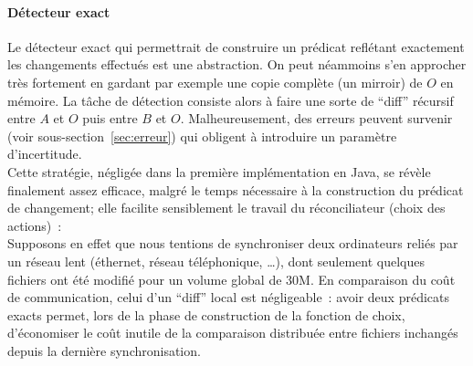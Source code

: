 \documentclass[11pt]{report}
\begin{document}
\paragraph{D\'etecteur exact\\}
Le d\'etecteur exact qui permettrait de construire un pr\'edicat refl\'etant 
exactement les changements effectu\'es est une abstraction. On peut n\'eammoins 
s'en approcher tr\`es
fortement en gardant par exemple une copie compl\`ete (un mirroir) de $O$ en 
m\'emoire. La t\^ache de d\'etection consiste alors \`a faire une sorte de ``diff'' 
r\'ecursif entre $A$ et $O$ puis entre $B$ et $O$.
Malheureusement, des erreurs peuvent survenir (voir sous-section~\ref{sec:erreur}) qui obligent \`a introduire un param\`etre d'incertitude.\\
Cette strat\'egie, n\'eglig\'ee dans la premi\`ere impl\'ementation en Java,
se r\'ev\`ele finalement assez efficace, malgr\'e le temps n\'ecessaire \`a la
construction du pr\'edicat de changement; elle facilite sensiblement
le travail du r\'econciliateur (choix des actions)~:\\
Supposons en effet que nous tentions de synchroniser deux ordinateurs reli\'es
par un r\'eseau lent (\'ethernet, r\'eseau t\'el\'ephonique, \ldots), dont
seulement quelques fichiers ont \'et\'e modifi\'e pour un volume global de 30M.
En comparaison du co\^ut de communication, celui d'un ``diff'' local est 
n\'egligeable~: avoir deux pr\'edicats exacts permet, lors de la phase de
construction de la fonction de choix, d'\'economiser le 
co\^ut inutile de la comparaison distribu\'ee entre fichiers inchang\'es 
depuis la derni\`ere synchronisation.
\end{document}

